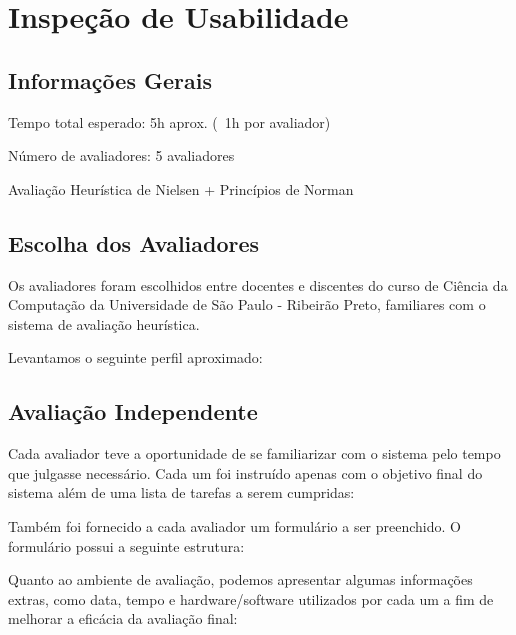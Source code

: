 \chapter{Inspeção de Usabilidade}

\section{Informações Gerais}

Tempo total esperado: 5h aprox. (~1h  por avaliador)

Número de avaliadores: 5 avaliadores

Avaliação Heurística de Nielsen + Princípios de Norman

\section{Escolha dos Avaliadores}

Os avaliadores foram escolhidos entre docentes e discentes do curso de Ciência da Computação da Universidade de São Paulo - Ribeirão Preto, familiares com o sistema de avaliação heurística.

Levantamos o seguinte perfil aproximado:



\section{Avaliação Independente}

Cada avaliador teve a oportunidade de se familiarizar com o sistema pelo tempo que julgasse necessário. Cada um foi instruído apenas com o objetivo final do sistema além de uma lista de tarefas a serem cumpridas:



Também foi fornecido a cada avaliador um formulário a ser preenchido. O formulário possui a seguinte estrutura:

\begin{tiny}
    

    
\end{tiny}

Quanto ao ambiente de avaliação, podemos apresentar algumas informações extras, como data, tempo e hardware/software utilizados por cada um a fim de melhorar a eficácia da avaliação final:

